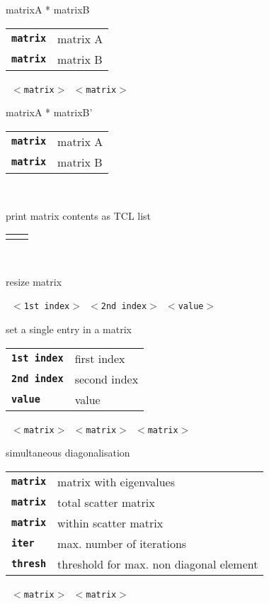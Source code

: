 \begin{description}
\begin{description}
        matrixA * matrixB

      \begin{tabular}{ll}
 \texttt{\textbf{matrix}} &  matrix A \\
 \texttt{\textbf{matrix}} &  matrix B \\
      \end{tabular}
       \texttt{ $<$matrix$>$ $<$matrix$>$} \

        matrixA * matrixB'

      \begin{tabular}{ll}
 \texttt{\textbf{matrix}} &  matrix A \\
 \texttt{\textbf{matrix}} &  matrix B \\
      \end{tabular}
       \texttt{ } \

        print matrix contents as TCL list

      \begin{tabular}{ll}
 \texttt{\textbf{}} &  \\
      \end{tabular}
       \texttt{} \

        resize matrix

       \texttt{ $<$1st index$>$ $<$2nd index$>$ $<$value$>$} \

        set a single entry in a matrix

      \begin{tabular}{ll}
 \texttt{\textbf{1st index}} &  first index  \\
 \texttt{\textbf{2nd index}} &  second index  \\
 \texttt{\textbf{value}} &      value  \\
      \end{tabular}
       \texttt{ $<$matrix$>$ $<$matrix$>$ $<$matrix$>$  } \

        simultaneous diagonalisation

      \begin{tabular}{ll}
 \texttt{\textbf{matrix}} &  matrix with eigenvalues \\
 \texttt{\textbf{matrix}} &  total scatter matrix \\
 \texttt{\textbf{matrix}} &  within scatter matrix \\
 \texttt{\textbf{iter}} &     max. number of iterations  \\
 \texttt{\textbf{thresh}} &   threshold for max. non diagonal element  \\
      \end{tabular}
       \texttt{ $<$matrix$>$ $<$matrix$>$ } \


\end{description}
\end{description}
